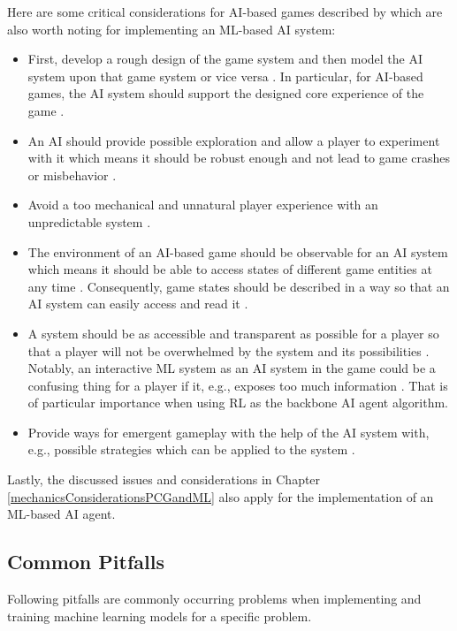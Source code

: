\documentclass[MGS,Master,english]{twbook}%
\begin{document}
Here are some critical considerations for AI-based games described by \citep{ai::gameDesign} which are also worth noting for implementing an ML-based AI system: 
\begin{itemize}
	\item First, develop a rough design of the game system and then model the AI system upon that game system or vice versa \cite{ai::gameDesign}. In particular, for AI-based games, the AI system should support the designed core experience of the game \cite{ai::gameDesign}.
	\item An AI should provide possible exploration and allow a player to experiment with it which means it should be robust enough and not lead to game crashes or misbehavior \cite{ai::gameDesign}. 
	\item Avoid a too mechanical and unnatural player experience with an unpredictable system \cite{ai::gameDesign}.
	\item The environment of an AI-based game should be observable for an AI system which means it should be able to access states of different game entities at any time \cite{ai::gameDesign}. Consequently, game states should be described in a way so that an AI system can easily access and read it \cite{ai::book}.
	\item A system should be as accessible and transparent as possible for a player so that a player will not be overwhelmed by the system and its possibilities \cite{ai::gameDesign}. Notably, an interactive ML system as an AI system in the game could be a confusing thing for a player if it, e.g., exposes too much information \cite{ai::gameDesign}. That is of particular importance when using \ac{RL} as the backbone AI agent algorithm.
	\item Provide ways for emergent gameplay with the help of the AI system with, e.g., possible strategies which can be applied to the system \cite{ai::gameDesign}. 
\end{itemize}

Lastly, the discussed issues and considerations in Chapter \ref{mechanicsConsiderationsPCGandML} also apply for the implementation of an ML-based AI agent.

\subsection{Common Pitfalls}
Following pitfalls are commonly occurring problems when implementing and training machine learning models for a specific problem.
\end{document}
